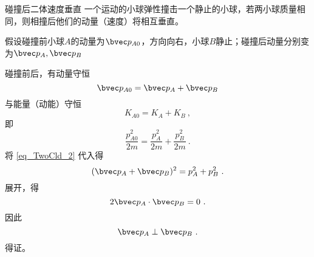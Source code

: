 \begin{example}{碰撞后二体速度垂直}
一个运动的小球弹性撞击一个静止的小球，若两小球质量相同，则相撞后他们的动量（速度）将相互垂直。

假设碰撞前小球$A$的动量为$\bvec p_{A0}$，方向向右，小球$B$静止；碰撞后动量分别变为$\bvec p_{A},\bvec p_{B}$

碰撞前后，有动量守恒
\begin{equation}\label{eq_TwoCld_2}
\bvec p_{A0} = \bvec p_{A} + \bvec p_{B}
\end{equation}
与能量（动能）守恒
\begin{equation}
K_{A0} = K_{A} + K_{B}~,
\end{equation}
即
\begin{equation}
\frac{p_{A0}^2}{2m}=\frac{p_{A}^2}{2m}+\frac{p_{B}^2}{2m}~.
\end{equation}
将 \autoref{eq_TwoCld_2} 代入得
\begin{equation}
(\bvec p_{A} + \bvec p_{B})^2=p_{A}^2+p_{B}^2~.
\end{equation}
展开，得
\begin{equation}
2\bvec p_{A} \cdot \bvec p_{B}=0~.
\end{equation}
因此
\begin{equation}
\bvec p_{A} \perp \bvec p_{B}~.
\end{equation}
得证。
\end{example}



